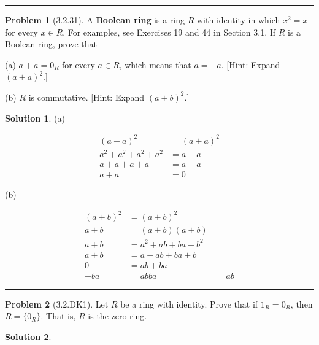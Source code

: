 \documentclass[12pt]{article}
\theoremstyle{definition}
\newtheorem*{prob}{Problem}
\newtheorem*{soln}{Solution}
\newcommand{\hr}{\vspace*{\parskip}\hrule}
\begin{document}
\hr

%
%


\begin{prob}[3.2.31]
A \textbf{Boolean ring} is a ring $R$ with identity in which 
$x^2 = x$ for every $x\in R$. For examples, see Exercises 19 and 44 in Section 3.1. 
If $R$ is a Boolean ring, prove that      

(a)   $a + a = 0_R$ for every $a\in R$, which means that $a = -a$. 
[Hint: Expand $(a + a)^2$.]     

(b) $R$ is commutative. [Hint: Expand $(a + b)^2$.]
\end{prob}

\begin{soln}

(a)

\begin{align*}
(a+a)^2&=(a+a)^2\\
a^2+a^2+a^2+a^2&=a+a\\
a+a+a+a&=a+a\\
a+a&=0
\end{align*}

(b)

\begin{align*}
(a+b)^2&=(a+b)^2\\
a+b&= (a+b)(a+b)\\
a+b&=a^2+ab+ba+b^2\\
a+b&=a+ab+ba+b\\
0&=ab+ba\\
-ba&=ab
ba&=ab
\end{align*}

\end{soln}

\hr

\begin{prob}[3.2.DK1]
Let $R$ be a ring with identity. Prove that if $1_R=0_R$, then
$R = \{ 0_R \}$. That is, $R$ is the zero ring.
\end{prob}

\begin{soln}

\end{soln}
\end{document}
